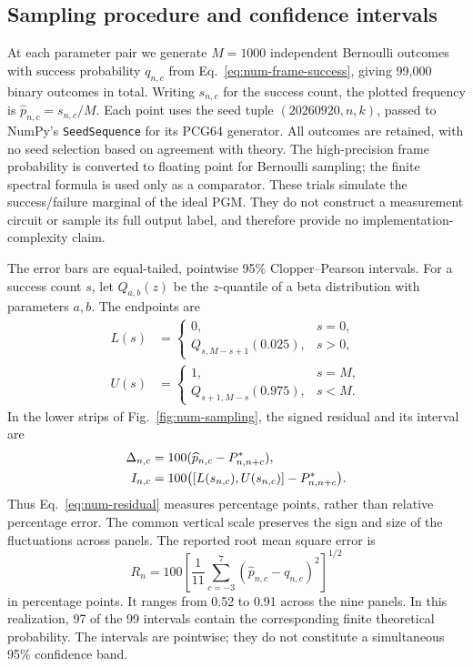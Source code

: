 \documentclass[journal,twocolumn]{IEEEtran}
\theoremstyle{definition}
\theoremstyle{plain}
\begin{document}
\subsection{Sampling procedure and confidence intervals}
At each parameter pair we generate $M=1000$ independent Bernoulli
outcomes with success probability $q_{n,c}$ from
Eq.~\eqref{eq:num-frame-success}, giving 99,000 binary outcomes in total.
Writing $s_{n,c}$ for the success count, the plotted frequency is
$\widehat p_{n,c}=s_{n,c}/M$.  Each point uses the seed tuple
$(20260920,n,k)$, passed to NumPy's \texttt{SeedSequence} for its
PCG64 generator.
All outcomes are retained, with no seed selection based on agreement
with theory.  The high-precision frame probability is converted to
floating point for Bernoulli sampling; the finite spectral formula is
used only as a comparator.
These trials simulate the success/failure marginal of the ideal PGM.
They do not construct a measurement circuit or sample its full output
label, and therefore provide no implementation-complexity claim.

The error bars are equal-tailed, pointwise 95\% Clopper--Pearson
intervals.  For a success count $s$, let $Q_{a,b}(z)$ be the
$z$-quantile of a beta distribution with parameters $a,b$.  The endpoints
are
\begin{align*}
 L(s)&=\begin{cases}
 0,&s=0,\\
 Q_{s,M-s+1}(0.025),&s>0,
 \end{cases}\\
 U(s)&=\begin{cases}
 1,&s=M,\\
 Q_{s+1,M-s}(0.975),&s<M.
 \end{cases}
\end{align*}
In the lower strips of Fig.~\ref{fig:num-sampling}, the signed residual
and its interval are
\begin{align}
 \Delta_{n,c}&=100(\widehat p_{n,c}-P^*_{n,n+c}),\notag\\
 I_{n,c}&=100\bigl([L(s_{n,c}),U(s_{n,c})]-P^*_{n,n+c}\bigr).
 \label{eq:num-residual}
\end{align}
Thus Eq.~\eqref{eq:num-residual} measures percentage points, rather
than relative percentage error.  The common vertical scale preserves
the sign and size of the fluctuations across panels.
The reported root mean square error is
\begin{equation*}
 R_n=100\left[\frac1{11}\sum_{c=-3}^{7}
              (\widehat p_{n,c}-q_{n,c})^2\right]^{1/2}
\end{equation*}
in percentage points.  It ranges from 0.52 to 0.91 across the nine
panels.  In this realization, 97 of the 99 intervals contain the
corresponding finite theoretical probability.  The intervals are
pointwise; they do not constitute a simultaneous 95\% confidence band.
\end{document}
